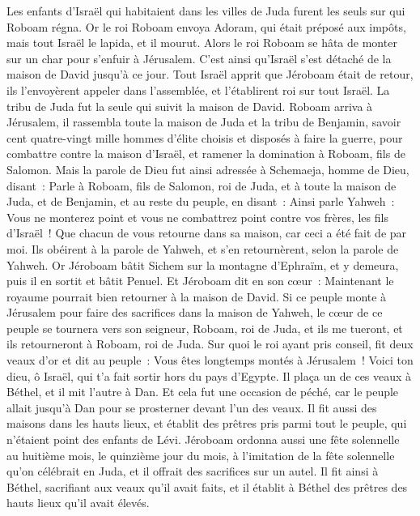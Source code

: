 \begin{multicols}{2}
Les enfants d'Israël qui habitaient dans les villes de Juda furent les seuls sur qui Roboam régna.
Or le roi Roboam envoya Adoram, qui était préposé aux impôts, mais tout Israël le lapida, et il mourut. Alors le roi Roboam se hâta de monter sur un char pour s'enfuir à Jérusalem.
C'est ainsi qu'Israël s'est détaché de la maison de David jusqu'à ce jour.
Tout Israël apprit que Jéroboam était de retour, ils l'envoyèrent appeler dans l'assemblée, et l'établirent roi sur tout Israël. La tribu de Juda fut la seule qui suivit la maison de David.
Roboam arriva à Jérusalem, il rassembla toute la maison de Juda et la tribu de Benjamin, savoir cent quatre-vingt mille hommes d'élite choisis et disposés à faire la guerre, pour combattre contre la maison d'Israël, et ramener la domination à Roboam, fils de Salomon.
Mais la parole de Dieu fut ainsi adressée à Schemaeja, homme de Dieu, disant~:
Parle à Roboam, fils de Salomon, roi de Juda, et à toute la maison de Juda, et de Benjamin, et au reste du peuple, en disant~:
Ainsi parle Yahweh~: Vous ne monterez point et vous ne combattrez point contre vos frères, les fils d'Israël~! Que chacun de vous retourne dans sa maison, car ceci a été fait de par moi. Ils obéirent à la parole de Yahweh, et s'en retournèrent, selon la parole de Yahweh.
Or Jéroboam bâtit Sichem sur la montagne d'Ephraïm, et y demeura, puis il en sortit et bâtit Penuel.
Et Jéroboam dit en son cœur~: Maintenant le royaume pourrait bien retourner à la maison de David.
Si ce peuple monte à Jérusalem pour faire des sacrifices dans la maison de Yahweh, le cœur de ce peuple se tournera vers son seigneur, Roboam, roi de Juda, et ils me tueront, et ils retourneront à Roboam, roi de Juda.
Sur quoi le roi ayant pris conseil, fit deux veaux d'or et dit au peuple~: Vous êtes longtemps montés à Jérusalem~! Voici ton dieu, ô Israël, qui t'a fait sortir hors du pays d'Egypte.
Il plaça un de ces veaux à Béthel, et il mit l'autre à Dan.
Et cela fut une occasion de péché, car le peuple allait jusqu'à Dan pour se prosterner devant l'un des veaux.
Il fit aussi des maisons dans les hauts lieux, et établit des prêtres pris parmi tout le peuple, qui n'étaient point des enfants de Lévi.
Jéroboam ordonna aussi une fête solennelle au huitième mois, le quinzième jour du mois, à l'imitation de la fête solennelle qu'on célébrait en Juda, et il offrait des sacrifices sur un autel. Il fit ainsi à Béthel, sacrifiant aux veaux qu'il avait faits, et il établit à Béthel des prêtres des hauts lieux qu'il avait élevés.

\end{multicols}
